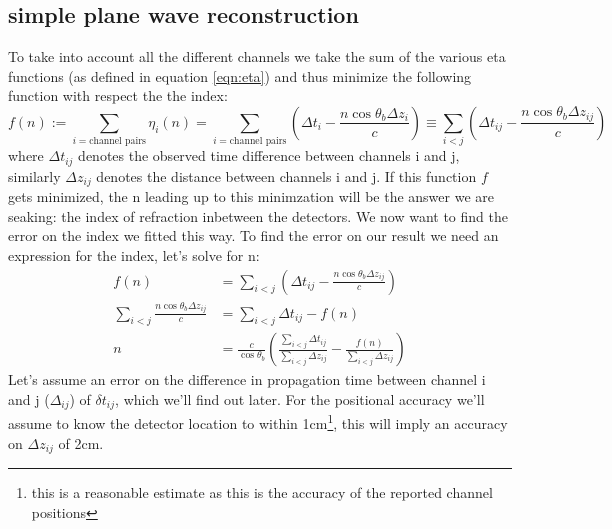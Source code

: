 \subsection{simple plane wave reconstruction}
\label{seq:SimplePW}
To take into account all the different channels we take the sum of the
various eta functions (as defined in equation \ref{eqn:eta}) and
thus minimize the following function with respect the the index:
\begin{equation}
	f(n) := \sum_{i=\text{channel pairs}}\eta_i(n) = \sum_{i=\text{channel pairs}}\left( \Delta t_i - \frac{n\cos\theta_b \Delta z_i}{c}\right) \equiv \sum_{i<j}\left( \Delta t_{ij} - \frac{n\cos\theta_b \Delta z_{ij}}{c}\right)
  	\label{eqn:PlaneWave}
\end{equation}
where $\Delta t_{ij}$ denotes the observed time difference between
channels i and j, similarly $\Delta z_{ij}$ denotes the distance
between channels i and j.
If this function $f$ gets minimized, the n leading up to this minimzation
will be the answer we are seaking: the index of refraction inbetween
the detectors.  
We now want to find the error on the index we fitted this way. To find the error on our result we need an expression for the index, let's solve for n:
\begin{align}
	f(n) &= \sum_{i<j}\left( \Delta t_{ij} - \frac{n\cos\theta_b \Delta z_{ij}}{c}\right)\\
\sum_{i<j}\frac{n\cos\theta_b \Delta z_{ij}}{c}&=\sum_{i<j}\Delta t_{ij} - f(n)\\
	n &= \frac{c}{\cos\theta_b}\left(\frac{\sum_{i<j}\Delta t_{ij}}{\sum_{i<j} \Delta z_{ij}} - \frac{f(n)}{\sum_{i<j} \Delta z_{ij}}\right)
\end{align}
Let's assume an error on the difference in propagation time between channel i and j
($\Delta_{ij}$) of $\delta t_{ij}$, which we'll find out later.  For the
positional accuracy we'll assume to know the detector location to within 1cm\footnote{this
is a reasonable estimate as this is the accuracy of the reported channel positions},
this will imply an accuracy on $\Delta z_{ij}$ of 2cm.

